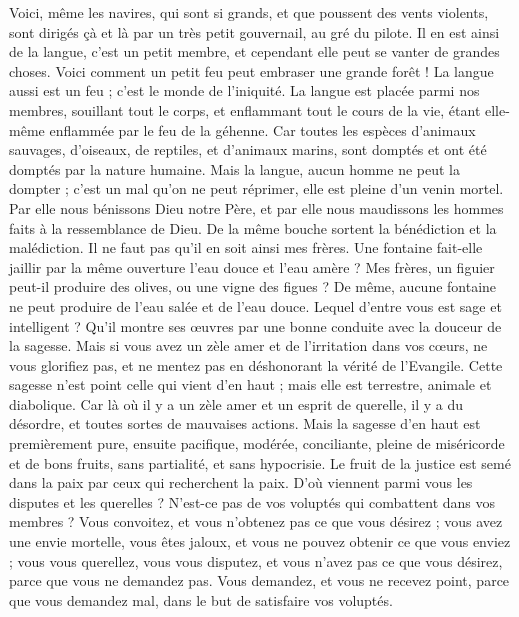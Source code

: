 \begin{multicols}{2}
Voici, même les navires, qui sont si grands, et que poussent des vents violents, sont dirigés çà et là par un très petit gouvernail, au gré du pilote.
Il en est ainsi de la langue, c'est un petit membre, et cependant elle peut se vanter de grandes choses. Voici comment un petit feu peut embraser une grande forêt !
La langue aussi est un feu ; c’est le monde de l’iniquité. La langue est placée parmi nos membres, souillant tout le corps, et enflammant tout le cours de la vie, étant elle-même enflammée par le feu de la géhenne.
Car toutes les espèces d’animaux sauvages, d'oiseaux, de reptiles, et d’animaux marins, sont domptés et ont été domptés par la nature humaine.
Mais la langue, aucun homme ne peut la dompter ; c'est un mal qu’on ne peut réprimer, elle est pleine d'un venin mortel.
Par elle nous bénissons Dieu notre Père, et par elle nous maudissons les hommes faits à la ressemblance de Dieu.
De la même bouche sortent la bénédiction et la malédiction. Il ne faut pas qu’il en soit ainsi mes frères.
Une fontaine fait-elle jaillir par la même ouverture l’eau douce et l’eau amère ?
Mes frères, un figuier peut-il produire des olives, ou une vigne des figues ? De même, aucune fontaine ne peut produire de l'eau salée et de l'eau douce.
Lequel d’entre vous est sage et intelligent ? Qu’il montre ses œuvres par une bonne conduite avec la douceur de la sagesse.
Mais si vous avez un zèle amer et de l'irritation dans vos cœurs, ne vous glorifiez pas, et ne mentez pas en déshonorant la vérité de l'Evangile.
Cette sagesse n’est point celle qui vient d'en haut ; mais elle est terrestre, animale{} et diabolique.
Car là où il y a un zèle amer et un esprit de querelle, il y a du désordre, et toutes sortes de mauvaises actions.
Mais la sagesse d'en haut est premièrement pure, ensuite pacifique, modérée, conciliante, pleine de miséricorde et de bons fruits, sans partialité, et sans hypocrisie.
Le fruit de la justice est semé dans la paix par ceux qui recherchent la paix.
\VerseOne{}D'où viennent parmi vous les disputes et les querelles ? N’est-ce pas de vos voluptés qui combattent dans vos membres ?
Vous convoitez, et vous n’obtenez pas ce que vous désirez ; vous avez une envie mortelle, vous êtes jaloux, et vous ne pouvez obtenir ce que vous enviez ; vous vous querellez, vous vous disputez, et vous n'avez pas ce que vous désirez, parce que vous ne demandez pas.
Vous demandez, et vous ne recevez point, parce que vous demandez mal, dans le but de satisfaire vos voluptés.

\end{multicols}
